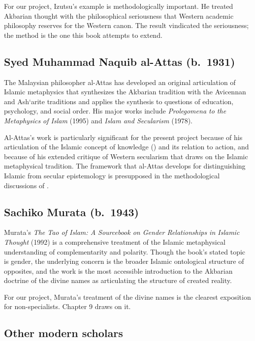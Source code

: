 For our project, Izutsu's example is methodologically important. He
treated Akbarian thought with the philosophical seriousness that
Western academic philosophy reserves for the Western canon. The
result vindicated the seriousness; the method is the one this book
attempts to extend.

\subsection{Syed Muhammad Naquib al-Attas (b.~1931)}

The Malaysian philosopher al-Attas has developed an original
articulation of Islamic metaphysics that synthesizes the Akbarian
tradition with the Avicennan and Ash`arite traditions and applies
the synthesis to questions of education, psychology, and social
order. His major works include \textit{Prolegomena to the
Metaphysics of Islam} (1995) and \textit{Islam and Secularism}
(1978).

Al-Attas's work is particularly significant for the present project
because of his articulation of the Islamic concept of knowledge
() and its relation to action, and because of his
extended critique of Western secularism that draws on the Islamic
metaphysical tradition. The framework that al-Attas develops for
distinguishing Islamic from secular epistemology is presupposed in
the methodological discussions of .

\subsection{Sachiko Murata (b.~1943)}

Murata's \textit{The Tao of Islam: A Sourcebook on Gender Relationships
in Islamic Thought} (1992) is a comprehensive treatment of the
Islamic metaphysical understanding of complementarity and polarity.
Though the book's stated topic is gender, the underlying concern is
the broader Islamic ontological structure of opposites, and the work
is the most accessible introduction to the Akbarian doctrine of the
divine names as articulating the structure of created reality.

For our project, Murata's treatment of the divine names is the
clearest exposition for non-specialists. Chapter 9 draws on it.

\subsection{Other modern scholars}

